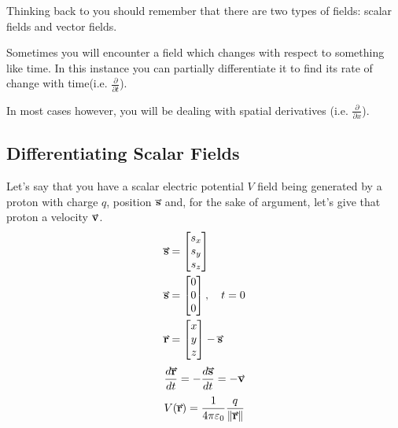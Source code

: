 \documentclass[main.tex]{subfiles}
\begin{document}
            Thinking back to  you should remember that there are two types of fields: scalar fields and vector fields.

            Sometimes you will encounter a field which changes with respect to something like time. In this instance you can partially differentiate it to find its rate of change with time(i.e. $\frac{\partial}{\partial t}$).

            In most cases however, you will be dealing with spatial derivatives (i.e. $\frac{\partial}{\partial x}$).

            \subsection{Differentiating Scalar Fields}
                \label{subsec: Differentiating Scalar Fields}

                Let's say that you have a scalar electric potential $V$ field being generated by a proton with charge $q$, position $\vect{s}$ and, for the sake of argument, let's give that proton a velocity $\vect{v}$.
                \begin{align*}
                    \vect{s} &= \Matrix{s_x\\s_y\\s_z} \\
                    \vect{s} &= \Matrix{0\\0\\0}, \hspace{1em} t=0 \\
                    \vect{r} &= \Matrix{x\\y\\z} - \vect{s}
                \end{align*}
                \begin{equation}
                    \frac{d\vect{r}}{dt} = -\frac{d\vect{s}}{dt} = -\vect{v}
                    \label{eq: Derivative of Voltage radius}
                \end{equation}
                \begin{equation}
                    V(\vect{r}) = \frac{1}{4\pi\varepsilon_0}\frac{q}{\vmod{\vect{r}}}
                    \label{eq: Proton Voltage of r}
                \end{equation}
\end{document}

